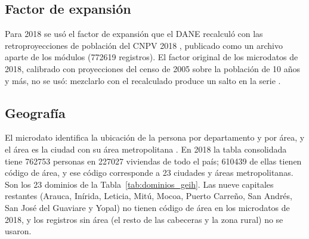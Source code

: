 \subsection{Factor de expansión}

Para 2018 se usó el factor de expansión que el DANE recalculó con las retroproyecciones de población del CNPV 2018 \cite[pp.~3, 19]{DANE_GEIH_Series2022}, publicado como un archivo aparte de los módulos (\num{772619} registros). El factor original de los microdatos de 2018, calibrado con proyecciones del censo de 2005 sobre la población de 10 años y más, no se usó: mezclarlo con el recalculado produce un salto en la serie \cite[p.~19]{DANE_GEIH_Series2022}.

\subsection{Geografía}

El microdato identifica la ubicación de la persona por departamento y por área, y el área es la ciudad con su área metropolitana \cite[p.~9]{DANE_GEIH_Metodologia2016}. En 2018 la tabla consolidada tiene \num{762753} personas en \num{227027} viviendas de todo el país; \num{610439} de ellas tienen código de área, y ese código corresponde a 23 ciudades y áreas metropolitanas. Son los 23 dominios de la Tabla~\ref{tab:dominios_geih}. Las nueve capitales restantes (Arauca, Inírida, Leticia, Mitú, Mocoa, Puerto Carreño, San Andrés, San José del Guaviare y Yopal) no tienen código de área en los microdatos de 2018, y los registros sin área (el resto de las cabeceras y la zona rural) no se usaron.

